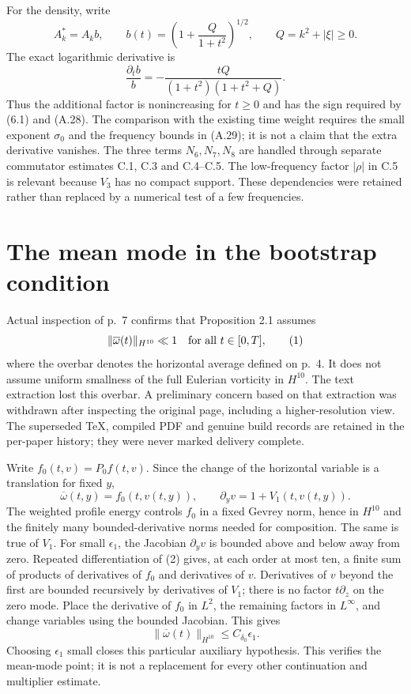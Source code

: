 \documentclass[10pt]{article}
\begin{document}
For the density, write \[A_k^*=A_k b,\qquad
 b(t)=\left(1+\frac{Q}{1+t^2}\right)^{1/2},
 \qquad Q=k^2+|\xi|\ge0.\] The exact logarithmic derivative is \[\frac{\partial_tb}{b}
 =-\frac{tQ}{(1+t^2)(1+t^2+Q)}.\] Thus the additional factor is nonincreasing for \(t\ge0\) and has the sign required by (6.1) and (A.28). The comparison with the existing time weight requires the small exponent \(\sigma_0\) and the frequency bounds in (A.29); it is not a claim that the extra derivative vanishes. The three terms \(N_6,N_7,N_8\) are handled through separate commutator estimates C.1, C.3 and C.4–C.5. The low-frequency factor \(|\rho|\) in C.5 is relevant because \(V_3\) has no compact support. These dependencies were retained rather than replaced by a numerical test of a few frequencies.\par
\section*{The mean mode in the bootstrap condition}
Actual inspection of p. 7 confirms that Proposition 2.1 assumes \[\|\overline{\omega}(t)\|_{H^{10}}\ll1
 \quad\hbox{for all }t\in[0,T],
 \tag{1}\] where the overbar denotes the horizontal average defined on p. 4. It does not assume uniform smallness of the full Eulerian vorticity in \(H^{10}\). The text extraction lost this overbar. A preliminary concern based on that extraction was withdrawn after inspecting the original page, including a higher-resolution view. The superseded TeX, compiled PDF and genuine build records are retained in the per-paper history; they were never marked delivery complete.\par
Write \(f_0(t,v)=P_0f(t,v)\). Since the change of the horizontal variable is a translation for fixed \(y\), \[\overline{\omega}(t,y)=f_0(t,v(t,y)),\qquad
 \partial_yv=1+V_1(t,v(t,y)).
 \tag{2}\] The weighted profile energy controls \(f_0\) in a fixed Gevrey norm, hence in \(H^{10}\) and the finitely many bounded-derivative norms needed for composition. The same is true of \(V_1\). For small \(\epsilon_1\), the Jacobian \(\partial_yv\) is bounded above and below away from zero. Repeated differentiation of (2) gives, at each order at most ten, a finite sum of products of derivatives of \(f_0\) and derivatives of \(v\). Derivatives of \(v\) beyond the first are bounded recursively by derivatives of \(V_1\); there is no factor \(t\partial_z\) on the zero mode. Place the derivative of \(f_0\) in \(L^2\), the remaining factors in \(L^\infty\), and change variables using the bounded Jacobian. This gives \[\|\overline{\omega}(t)\|_{H^{10}}
       \le C_{\delta_0}\epsilon_1.
 \tag{3}\] Choosing \(\epsilon_1\) small closes this particular auxiliary hypothesis. This verifies the mean-mode point; it is not a replacement for every other continuation and multiplier estimate.\par
\end{document}
